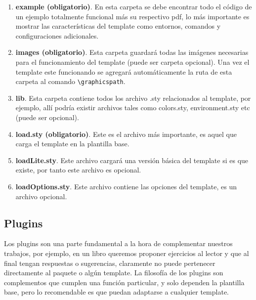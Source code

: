 {\begin{enumerate}
		\item \textbf{example (obligatorio)}. En esta carpeta se debe encontrar todo el código de un ejemplo totalmente funcional más su respectivo pdf, lo más importante es mostrar las características del template como entornos, comandos y configuraciones adicionales. 
		\item \textbf{images (obligatorio)}. Esta carpeta guardará todas las imágenes necesarias para el funcionamiento del template (puede ser carpeta opcional). Una vez el template este funcionando se agregará automáticamente la ruta de esta carpeta al comando \verb|\graphicspath|.
		\item \textbf{lib}. Esta carpeta contiene todos los archivo .sty relacionados al template, por ejemplo, allí podría existir archivos tales como colors.sty, environment.sty etc (puede ser opcional).
		\item \textbf{load.sty (obligatorio)}. Este es el archivo más importante, es aquel que carga el template en la plantilla base.
		\item \textbf{loadLite.sty}. Este archivo cargará una versión básica del template si es que existe, por tanto este archivo es opcional.
		\item \textbf{loadOptions.sty}. Este archivo contiene las opciones del template, es un archivo opcional.
	\end{enumerate}
	\subsection{Plugins}
	Los plugins son una parte fundamental a la hora de complementar nuestros trabajos, por ejemplo, en un libro queremos proponer ejercicios al lector y que al final tengan respuestas o sugerencias, claramente no puede pertenecer directamente al paquete \printproject\space o algún template. \pap La filosofía de los plugins son complementos que cumplen una función particular, y solo dependen la plantilla base, pero lo recomendable es que puedan adaptarse a cualquier template.
}
